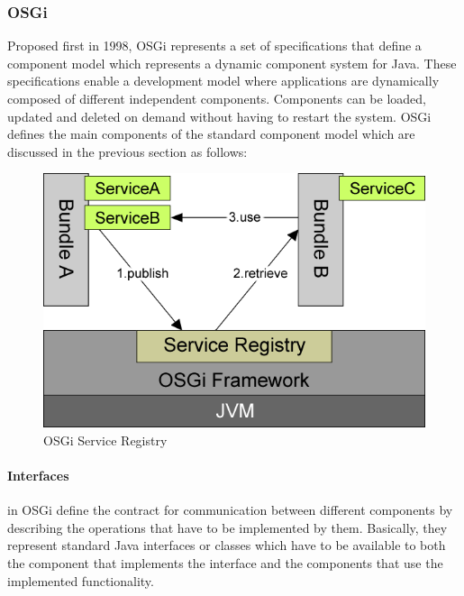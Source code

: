 \subsubsection{OSGi}

Proposed first in 1998, OSGi represents a set of specifications that define a component model which represents a dynamic component system for Java. These specifications enable a development model where applications are dynamically composed of different independent components. Components can be loaded, updated and deleted on demand without having to restart the system. OSGi defines the main components of the standard component model which are discussed in the previous section as follows:

\begin{figure}[h!]
  \centering
  	\includegraphics[scale=0.6]{plug-in/OSGi.png}
  \caption{OSGi Service Registry \cite{tavares2008gentle}}
  \label{fig_OSGi}
\end{figure}

\paragraph{Interfaces}
 in OSGi define the contract for communication between different components by describing the operations that have to be implemented by them. Basically, they represent standard Java interfaces or classes which have to be available to both the component that implements the interface and the components that use the implemented functionality.


